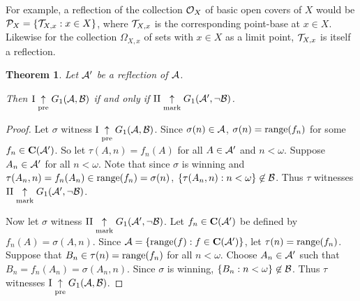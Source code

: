 \documentclass{amsart}
\theoremstyle{plain}
\newtheorem{theorem}{Theorem}
\theoremstyle{definition}
\theoremstyle{remark}
\theoremstyle{plain}
\theoremstyle{definition}
\theoremstyle{remark}
\begin{document}
  For example, a reflection of the collection \(\mathcal{O}_X\) of basic open covers
  of \(X\) would be \(\mathcal{P}_X=\{\mathcal{T}_{X,x}:x\in X\}\), where \(\mathcal{T}_{X,x}\) 
  is the corresponding point-base at \(x\in X\). 
  Likewise for the collection \(\Omega_{X,x}\)
  of sets with \(x\in X\) as a limit point, \(\mathcal{T}_{X,x}\) is itself
  a reflection.

\begin{theorem}
  Let \(\mathcal{A}'\) be a reflection of \(\mathcal{A}\). 

  Then
  \(\mathrm{I}\underset{\text{pre}}{\uparrow}G_{1}(\mathcal{A},\mathcal{B})\) if and only if
  \(\mathrm{II}\underset{\text{mark}}{\uparrow}G_{1}(\mathcal{A}',\neg\mathcal{B})\).
\end{theorem}

\begin{proof}
  Let \(\sigma\) witness 
  \(\mathrm{I}\underset{\text{pre}}{\uparrow}G_{1}(\mathcal{A},\mathcal{B})\).
  Since \(\sigma(n)\in\mathcal{A}\), \(\sigma(n)=\text{range}(f_n)\)
  for some \(f_n\in\mathbf C(\mathcal{A}')\). So let
  \(\tau(A,n)=f_n(A)\) for all \(A\in \mathcal{A}'\) and \(n<\omega\).
  Suppose \(A_n\in \mathcal{A}'\) for all \(n<\omega\).
  Note that since \(\sigma\) is winning and 
  \(\tau(A_n,n)=f_n(A_n)\in\text{range}(f_n)=\sigma(n)\),
  \(\{\tau(A_n,n):n<\omega\}\not\in\mathcal{B}\). Thus \(\tau\) witnesses
  \(\mathrm{II}\underset{\text{mark}}{\uparrow}G_{1}(\mathcal{A}',\neg\mathcal{B})\).

  Now let \(\sigma\) witness
  \(\mathrm{II}\underset{\text{mark}}{\uparrow}G_{1}(\mathcal{A}',\neg\mathcal{B})\).
  Let \(f_n\in\mathbf C(\mathcal{A}')\) be defined by \(f_n(A)=\sigma(A,n)\).
  Since \(\mathcal{A}=\{\text{range}(f):f\in\mathbf C(\mathcal{A}')\}\), let
  \(\tau(n)=\text{range}(f_n)\). Suppose that \(B_n\in\tau(n)=\text{range}(f_n)\) for
  all \(n<\omega\). Choose \(A_n\in\mathcal{A}'\) such that 
  \(B_n=f_n(A_n)=\sigma(A_n,n)\). Since \(\sigma\) is winning,
  \(\{B_n:n<\omega\}\not\in\mathcal{B}\). Thus \(\tau\) witnesses
  \(\mathrm{I}\underset{\text{pre}}{\uparrow}G_{1}(\mathcal{A},\mathcal{B})\).
\end{proof}



\end{document}
